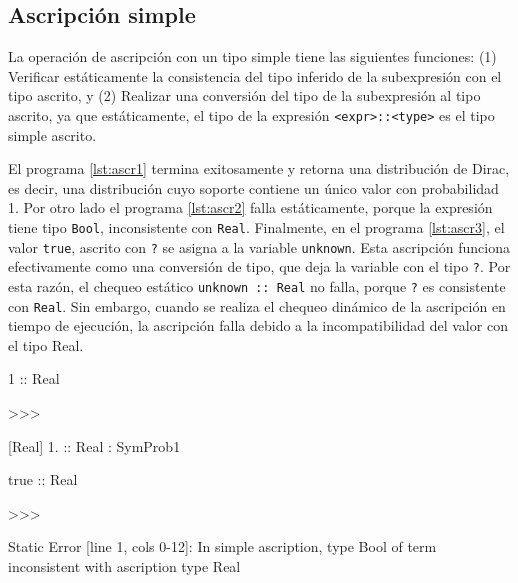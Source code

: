 

  

  
\subsection{Ascripción simple}
La operación de ascripción con un tipo simple tiene las siguientes
funciones: (1) Verificar estáticamente la consistencia del tipo
inferido de la subexpresión con el tipo ascrito, y (2) Realizar una
conversión del tipo de la subexpresión al tipo ascrito, ya que
estáticamente, el tipo de la expresión \lstinline|<expr>::<type>| es
el tipo simple ascrito.


El programa \ref{lst:ascr1} termina exitosamente y retorna una
distribución de Dirac, es decir, una distribución cuyo soporte
contiene un único valor con probabilidad 1. Por otro lado el programa
\ref{lst:ascr2} falla estáticamente, porque la expresión tiene tipo
\lstinline|Bool|, inconsistente con \lstinline|Real|. Finalmente, en
el programa \ref{lst:ascr3}, el valor \lstinline|true|, ascrito con
\lstinline|?| se asigna a la variable \lstinline|unknown|.  Esta
ascripción funciona efectivamente como una conversión de tipo, que deja la variable
con el tipo \lstinline|?|.  Por esta razón, el chequeo estático
\lstinline|unknown :: Real| no falla, porque \lstinline|?| es
consistente con \lstinline|Real|.  Sin embargo, cuando se realiza el
chequeo dinámico de la ascripción en tiempo de ejecución, la
ascripción falla debido a la incompatibilidad del valor con el tipo
Real.

\begin{gplcblock}[caption={Ascripción de tipo \texttt{Real}},label={lst:ascr1}]
1 :: Real

>>>

{
	 [Real] 1. :: Real : SymProb1 
}  

\end{gplcblock}


\begin{gplcblock}[caption={Ascripción fallida},label={lst:ascr2}]
true :: Real

>>>

Static Error [line 1, cols 0-12]: In simple ascription, type Bool of term inconsistent with ascription type Real
\end{gplcblock}

